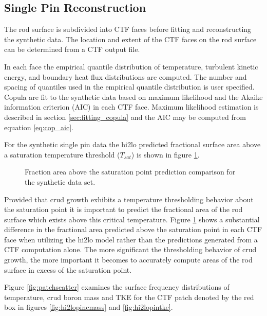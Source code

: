 \subsection{Single Pin Reconstruction}

The rod surface is subdivided into CTF faces before fitting and reconstructing the synthetic data.  The location and extent of the CTF faces on the rod surface can be determined from a CTF output file.  

In each face the empirical quantile distribution of temperature, turbulent kinetic energy, and boundary heat flux distributions are computed.  The number and spacing of quantiles used in the empirical quantile distribution is user specified.  Copula are fit to the synthetic data based on maximum likelihood and the Akaike information criterion (AIC) in each CTF face.  Maximum likelihood estimation is described in section \ref{sec:fitting_copula} and the AIC may be computed from equation \ref{eq:cop_aic}.

For the synthetic single pin data the hi2lo predicted fractional surface area above a saturation temperature threshold ($T_{sat}$) is shown in figure \ref{fig:frac_a}.

\begin{figure}[H]%
    \centering
    \qquad
    \caption[]{Fraction area above the saturation point prediction comparison for the synthetic data set.}%
    \label{fig:frac_a}%
\end{figure}

Provided that crud growth exhibits a temperature thresholding behavior about the saturation point it is important to predict the fractional area of the rod surface which exists above this critical temperature. Figure \ref{fig:frac_a} shows a substantial difference in the fractional area predicted above the saturation point in each CTF face when utilizing the hi2lo model rather than the predictions generated from a CTF computation alone.  The more significant the thresholding behavior of crud growth, the more important it becomes to accurately compute areas of the rod surface in excess of the saturation point.

Figure \ref{fig:patchscatter} examines the surface frequency distributions of temperature, crud boron mass and TKE for the CTF patch denoted by the red box in figures \ref{fig:hi2lopincmass} and \ref{fig:hi2lopintke}.

